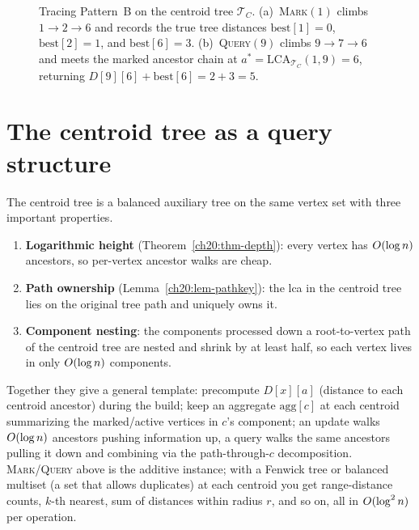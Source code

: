 \begin{figure}[H]
\caption{Tracing Pattern~B on the centroid tree $\mathcal{T}_C$.
(a)~\textsc{Mark}$(1)$ climbs $1\to 2\to 6$ and records the true tree distances
$\mathrm{best}[1]=0$, $\mathrm{best}[2]=1$, and $\mathrm{best}[6]=3$.
(b)~\textsc{Query}$(9)$ climbs $9\to 7\to 6$ and meets the marked ancestor chain at
$a^*=\mathrm{LCA}_{\mathcal{T}_C}(1,9)=6$, returning $D[9][6]+\mathrm{best}[6]=2+3=5$.}
\label{ch20:fig-nearest-marked}
\end{figure}

\section{The centroid tree as a query structure}
\label{ch20:querytree}

The centroid tree is a balanced auxiliary tree
on the same vertex set with three important properties.

\begin{enumerate}
  \item \textbf{Logarithmic height} (Theorem~\ref{ch20:thm-depth}): every vertex
        has $O(\log n)$ ancestors, so per-vertex ancestor walks are cheap.
  \item \textbf{Path ownership} (Lemma~\ref{ch20:lem-pathkey}): the lca in the
        centroid tree lies on the original tree path and uniquely owns it.
  \item \textbf{Component nesting}: the components processed down a root-to-vertex
        path of the centroid tree are nested and shrink by at least half, so each
        vertex lives in only $O(\log n)$ components.
\end{enumerate}

Together they give a general template: precompute $D[x][a]$
(distance to each centroid ancestor) during the build; keep an aggregate
$\mathrm{agg}[c]$ at each centroid summarizing the marked/active vertices in $c$'s
component; an update walks $O(\log n)$ ancestors pushing information up, a query
walks the same ancestors pulling it down and combining via the path-through-$c$
decomposition. \textsc{Mark}/\textsc{Query} above is the additive instance; with a
Fenwick tree or balanced multiset (a set that allows duplicates) at each centroid you get range-distance counts,
$k$-th nearest, sum of distances within radius $r$, and so on, all in
$O(\log^2 n)$ per operation.


